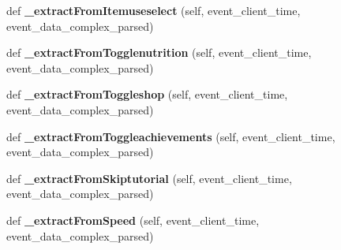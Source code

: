 \begin{DoxyCompactItemize}
\mbox{\label{classfeature__extractors_1_1_lakeland_extractor_1_1_lakeland_extractor_abd0620b1274a5402265aa4d098deaeb7}} 
def {\bfseries \+\_\+extract\+From\+Itemuseselect} (self, event\+\_\+client\+\_\+time, event\+\_\+data\+\_\+complex\+\_\+parsed)
\item 
\mbox{\label{classfeature__extractors_1_1_lakeland_extractor_1_1_lakeland_extractor_abeda3105674afe8c74c8af3f362bb2d1}} 
def {\bfseries \+\_\+extract\+From\+Togglenutrition} (self, event\+\_\+client\+\_\+time, event\+\_\+data\+\_\+complex\+\_\+parsed)
\item 
\mbox{\label{classfeature__extractors_1_1_lakeland_extractor_1_1_lakeland_extractor_a8e6b518778e0abddf424c63c86a16cdd}} 
def {\bfseries \+\_\+extract\+From\+Toggleshop} (self, event\+\_\+client\+\_\+time, event\+\_\+data\+\_\+complex\+\_\+parsed)
\item 
\mbox{\label{classfeature__extractors_1_1_lakeland_extractor_1_1_lakeland_extractor_a4641970c117da671359d9b0f305e28b2}} 
def {\bfseries \+\_\+extract\+From\+Toggleachievements} (self, event\+\_\+client\+\_\+time, event\+\_\+data\+\_\+complex\+\_\+parsed)
\item 
\mbox{\label{classfeature__extractors_1_1_lakeland_extractor_1_1_lakeland_extractor_a5760fe21fa36376cc09f07cbeb5091c3}} 
def {\bfseries \+\_\+extract\+From\+Skiptutorial} (self, event\+\_\+client\+\_\+time, event\+\_\+data\+\_\+complex\+\_\+parsed)
\item 
\mbox{\label{classfeature__extractors_1_1_lakeland_extractor_1_1_lakeland_extractor_a28dbe31c955844f20ffe308c1db1a044}} 
def {\bfseries \+\_\+extract\+From\+Speed} (self, event\+\_\+client\+\_\+time, event\+\_\+data\+\_\+complex\+\_\+parsed)
\item 
\mbox{\label{classfeature__extractors_1_1_lakeland_extractor_1_1_lakeland_extractor_ad70890275088db94d0627ec92a4c5449}} 

\end{DoxyCompactItemize}
